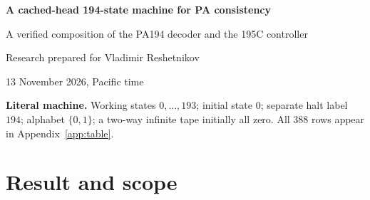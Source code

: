 \documentclass[11pt]{article}
\newcommand{\PA}{\mathsf{PA}}
\newcommand{\Con}{\operatorname{Con}}
\newcommand{\Halt}{\operatorname{Halt}}
\newcommand{\M}{\mathsf{PA194C}}
\begin{document}
\begin{titlepage}
\vspace*{1.1cm}
{\color{ink}\Huge\bfseries A cached-head 194-state machine for PA consistency\par}
\vspace{0.7cm}
{\Large A verified composition of the PA194 decoder and the 195C controller\par}
\vspace{1cm}
{\large Research prepared for Vladimir Reshetnikov\par}
{\large 13 November 2026, Pacific time\par}
\vspace{1cm}
\begin{abstract}
We compare the PA-consistency machine families present in the requested
ProveIt directories at commit
\texttt{768c2be1a8e4d2fcf8aa3443c7b0f084d145734c}.
The completed construction is a materially different binary, single-tape,
blank-start machine with 194 working states. It combines the 67-reader,
seven-fold AX decoder of PA194 with the cached-head Shift and modus-ponens
controller of 195C. The combination changes six native transition rows,
and implements a 3,649-site source program with 4,749 primitive outcomes.
Both a construction checker and an independent literal-tape symbolic
checker pass. The latter reconstructs its arithmetic-list lemmas from the
actual rows, checks arbitrary register values, and checks the exact
57,922-step blank startup. A syntactic consistency calibration and positive
finite-trace simulation establish the ordinary mathematical statement
\[
\PA\vdash\bigl(\neg\Halt(\M,\text{blank})\leftrightarrow\Con(\PA)\bigr).
\]
The contribution is this checked composition and its corpus comparison;
the separate-head calculus, cached-head protocol, and decoder folds are
credited to their supplied sources. No new end-to-end Lean or Rocq endpoint
is claimed. The bounded reduction searches reported here do not establish
a smaller machine or a lower bound.
\end{abstract}
\vfill
\noindent\textbf{Literal machine.} Working states $0,\ldots,193$; initial
state $0$; separate halt label $194$; alphabet $\{0,1\}$; a two-way infinite
tape initially all zero. All 388 rows appear in Appendix~\ref{app:table}.
\end{titlepage}
\tableofcontents
\newpage

\section{Result and scope}
\end{document}
